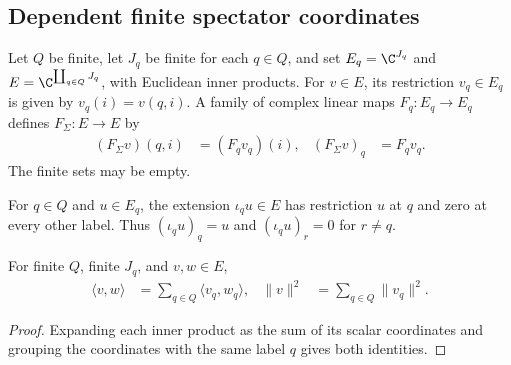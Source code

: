 \subsection{Dependent finite spectator coordinates}
\label{subsec:mpo_dependent_spectator_gap}

\begin{definition}
    \label{def:mpo_sigma_fiber_operator}
    \leanok
    Let $Q$ be finite, let $J_q$ be finite for each $q\in Q$, and set
    $E_q=\C^{J_q}$ and $E=\C^{\coprod_{q\in Q}J_q}$, with Euclidean inner
    products.  For $v\in E$, its restriction $v_q\in E_q$ is given by
    $v_q(i)=v(q,i)$.  A family of complex linear maps $F_q:E_q\to E_q$
    defines $F_\Sigma:E\to E$ by
    \begin{align}
        (F_\Sigma v)(q,i) & =(F_qv_q)(i), & (F_\Sigma v)_q & =F_qv_q.
    \end{align}
    The finite sets may be empty.
\end{definition}

\begin{definition}
    \label{def:mpo_single_sigma_fiber}
    \leanok
    For $q\in Q$ and $u\in E_q$, the extension $\iota_qu\in E$ has
    restriction $u$ at $q$ and zero at every other label.  Thus
    $(\iota_qu)_q=u$ and $(\iota_qu)_r=0$ for $r\ne q$.
\end{definition}

\begin{lemma}
    \label{thm:mpo_sigma_fiber_inner_norm}
    \leanok
    For finite $Q$, finite $J_q$, and $v,w\in E$,
    \begin{align}
        \langle v,w\rangle & =\sum_{q\in Q}\langle v_q,w_q\rangle,
                           & \|v\|^2                               & =\sum_{q\in Q}\|v_q\|^2.
    \end{align}
\end{lemma}
\begin{proof}
    \leanok
    Expanding each inner product as the sum of its scalar coordinates and
    grouping the coordinates with the same label $q$ gives both identities.
\end{proof}

